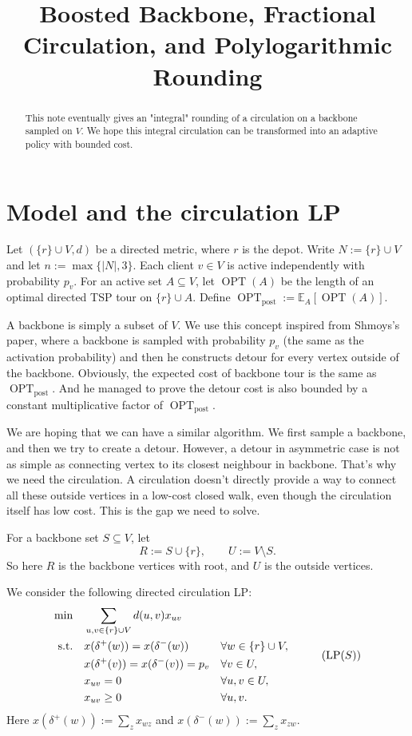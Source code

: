 \documentclass[11pt]{article}
\title{Boosted Backbone, Fractional Circulation, and Polylogarithmic Rounding}
\author{}
\date{}
\DeclareMathOperator{\OPT}{OPT}
\newcommand{\E}{\mathbb{E}}
\newcommand{\1}{\mathbf{1}}
\newcommand{\optpost}{\OPT_{\mathrm{post}}}
\begin{document}
\maketitle

\begin{abstract}
This note eventually gives an "integral" rounding of a circulation on a backbone 
sampled on $V$. We hope  this integral circulation can be transformed into an 
adaptive policy with bounded cost.
\end{abstract}

\section{Model and the circulation LP}

Let $(\{r\}\cup V,d)$ be a directed metric, where $r$ is the depot.  Write
$N:=\{r\}\cup V$ and let
\(
  n:=\max\{|N|,3\}.
\)
Each client $v\in V$ is active independently with probability $p_v$.  For an
active set $A\subseteq V$, let $\OPT(A)$ be the length of an optimal directed
TSP tour on $\{r\}\cup A$.  Define
\(
  \OPT_{\mathrm{post}}:=\E_A[\OPT(A)].
\)

A backbone is simply a subset of $V$. We use this concept inspired from Shmoys's
paper, where a backbone is sampled with probability $p_v$ (the same
as the activation probability) and then he constructs detour for every vertex 
outside of the backbone. Obviously, the expected cost of backbone tour is the 
same as $\optpost$. And he managed to prove the detour cost is also 
bounded by a constant multiplicative factor of $\optpost$.

We are hoping that we can have a similar algorithm. We first sample a backbone, 
and then we try to create a detour. However, a detour in asymmetric case is not 
as simple as connecting vertex to its closest neighbour in backbone. That's why 
we need the circulation. A circulation doesn't directly provide a way to connect 
all these outside vertices in a low-cost closed walk, even though the circulation 
itself has low cost. This is the gap we need to solve.

For a backbone set $S\subseteq V$, let
\[
  R:=S\cup\{r\},
  \qquad
  U:=V\setminus S.
\]
So here $R$ is the backbone vertices with root, and $U$ is the outside vertices.

We consider the following directed circulation LP:
\[
\begin{aligned}
\min \quad & \sum_{u,v\in \{r\}\cup V} d(u,v)x_{uv} \\
\text{s.t.}\quad
& x(\delta^+(w))=x(\delta^-(w)) && \forall w\in \{r\}\cup V, \\
& x(\delta^+(v))=x(\delta^-(v)) = p_v && \forall v\in U, \\
& x_{uv}=0 && \forall u,v\in U, \\
& x_{uv}\ge 0 && \forall u,v.
\end{aligned}
\tag{$\mathrm{LP}(S)$}
\]
Here $x(\delta^+(w)):=\sum_z x_{wz}$ and
$x(\delta^-(w)):=\sum_z x_{zw}$.
\end{document}
